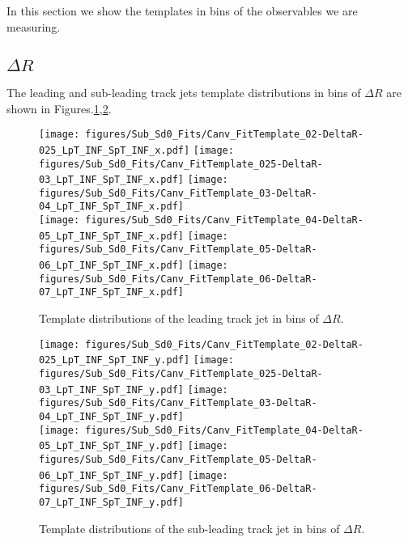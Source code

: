 
In this section we show the \subsdzero templates in bins of the observables we are measuring. 

\subsection{$\Delta R$}

The leading and sub-leading track jets template \subsdzero distributions in bins of $\Delta R$ are shown in Figures.\ref{fig:dR-template-leading},\ref{fig:dR-template-subleading}.

\begin{figure}[htbp]
  \centering
 \texttt{[image: figures/Sub\_Sd0\_Fits/Canv\_FitTemplate\_02-DeltaR-025\_LpT\_INF\_SpT\_INF\_x.pdf]}
 \texttt{[image: figures/Sub\_Sd0\_Fits/Canv\_FitTemplate\_025-DeltaR-03\_LpT\_INF\_SpT\_INF\_x.pdf]}
 \texttt{[image: figures/Sub\_Sd0\_Fits/Canv\_FitTemplate\_03-DeltaR-04\_LpT\_INF\_SpT\_INF\_x.pdf]}\\
 \texttt{[image: figures/Sub\_Sd0\_Fits/Canv\_FitTemplate\_04-DeltaR-05\_LpT\_INF\_SpT\_INF\_x.pdf]}
 \texttt{[image: figures/Sub\_Sd0\_Fits/Canv\_FitTemplate\_05-DeltaR-06\_LpT\_INF\_SpT\_INF\_x.pdf]}
 \texttt{[image: figures/Sub\_Sd0\_Fits/Canv\_FitTemplate\_06-DeltaR-07\_LpT\_INF\_SpT\_INF\_x.pdf]}\\

\caption{Template \subsdzero distributions of the leading track jet in bins of $\Delta R$. }
  \label{fig:dR-template-leading}
\end{figure}


\begin{figure}[htbp]
  \centering
 \texttt{[image: figures/Sub\_Sd0\_Fits/Canv\_FitTemplate\_02-DeltaR-025\_LpT\_INF\_SpT\_INF\_y.pdf]}
 \texttt{[image: figures/Sub\_Sd0\_Fits/Canv\_FitTemplate\_025-DeltaR-03\_LpT\_INF\_SpT\_INF\_y.pdf]}
 \texttt{[image: figures/Sub\_Sd0\_Fits/Canv\_FitTemplate\_03-DeltaR-04\_LpT\_INF\_SpT\_INF\_y.pdf]}\\
 \texttt{[image: figures/Sub\_Sd0\_Fits/Canv\_FitTemplate\_04-DeltaR-05\_LpT\_INF\_SpT\_INF\_y.pdf]}
 \texttt{[image: figures/Sub\_Sd0\_Fits/Canv\_FitTemplate\_05-DeltaR-06\_LpT\_INF\_SpT\_INF\_y.pdf]}
 \texttt{[image: figures/Sub\_Sd0\_Fits/Canv\_FitTemplate\_06-DeltaR-07\_LpT\_INF\_SpT\_INF\_y.pdf]}\\

\caption{Template \subsdzero distributions of the sub-leading track jet in bins of $\Delta R$. }
  \label{fig:dR-template-subleading}
\end{figure}


